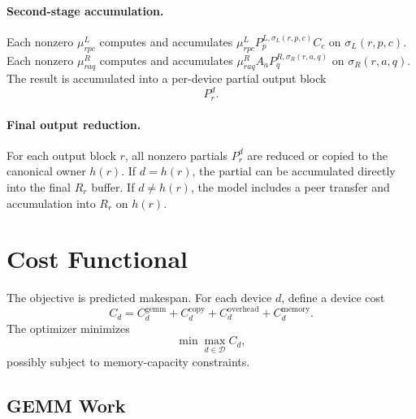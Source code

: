 \documentclass[11pt]{article}
\begin{document}
\paragraph{Second-stage accumulation.}
Each nonzero $\mu^L_{rpc}$ computes and accumulates
$\mu^L_{rpc}P^{L,\sigma_L(r,p,c)}_pC_c$ on $\sigma_L(r,p,c)$.  Each nonzero
$\mu^R_{raq}$ computes and accumulates
$\mu^R_{raq}A_aP^{R,\sigma_R(r,a,q)}_q$ on $\sigma_R(r,a,q)$.  The result is
accumulated into a per-device partial output block
\begin{equation}
  P^d_r.
\end{equation}

\paragraph{Final output reduction.}
For each output block $r$, all nonzero partials $P^d_r$ are reduced or copied
to the canonical owner $h(r)$.  If $d=h(r)$, the partial can be accumulated
directly into the final $R_r$ buffer.  If $d \ne h(r)$, the model includes a
peer transfer and accumulation into $R_r$ on $h(r)$.

\section{Cost Functional}

The objective is predicted makespan.  For each device $d$, define a device cost
\begin{equation}
  C_d =
    C^{\mathrm{gemm}}_d
  + C^{\mathrm{copy}}_d
  + C^{\mathrm{overhead}}_d
  + C^{\mathrm{memory}}_d.
\end{equation}
The optimizer minimizes
\begin{equation}
  \min \max_{d \in \mathcal{D}} C_d,
\end{equation}
possibly subject to memory-capacity constraints.

\subsection{GEMM Work}
\end{document}
